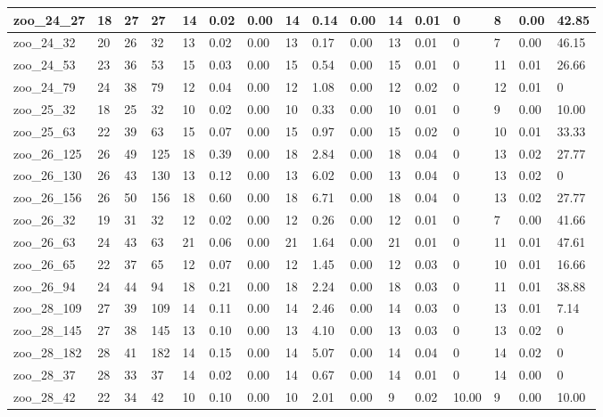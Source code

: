 \begin{landscape}
\begin{longtable}{llllllllllllllll}
zoo\_24\_27 & 18 & 27 & 27 & 14 & 0.02 & 0.00 & 14 & 0.14 & 0.00 & 14 & 0.01 & 0 & 8 & 0.00 & 42.85 \\ \hline 
zoo\_24\_32 & 20 & 26 & 32 & 13 & 0.02 & 0.00 & 13 & 0.17 & 0.00 & 13 & 0.01 & 0 & 7 & 0.00 & 46.15 \\ \hline 
zoo\_24\_53 & 23 & 36 & 53 & 15 & 0.03 & 0.00 & 15 & 0.54 & 0.00 & 15 & 0.01 & 0 & 11 & 0.01 & 26.66 \\ \hline 
zoo\_24\_79 & 24 & 38 & 79 & 12 & 0.04 & 0.00 & 12 & 1.08 & 0.00 & 12 & 0.02 & 0 & 12 & 0.01 & 0 \\ \hline 
zoo\_25\_32 & 18 & 25 & 32 & 10 & 0.02 & 0.00 & 10 & 0.33 & 0.00 & 10 & 0.01 & 0 & 9 & 0.00 & 10.00 \\ \hline 
zoo\_25\_63 & 22 & 39 & 63 & 15 & 0.07 & 0.00 & 15 & 0.97 & 0.00 & 15 & 0.02 & 0 & 10 & 0.01 & 33.33 \\ \hline 
zoo\_26\_125 & 26 & 49 & 125 & 18 & 0.39 & 0.00 & 18 & 2.84 & 0.00 & 18 & 0.04 & 0 & 13 & 0.02 & 27.77 \\ \hline 
zoo\_26\_130 & 26 & 43 & 130 & 13 & 0.12 & 0.00 & 13 & 6.02 & 0.00 & 13 & 0.04 & 0 & 13 & 0.02 & 0 \\ \hline 
zoo\_26\_156 & 26 & 50 & 156 & 18 & 0.60 & 0.00 & 18 & 6.71 & 0.00 & 18 & 0.04 & 0 & 13 & 0.02 & 27.77 \\ \hline 
zoo\_26\_32 & 19 & 31 & 32 & 12 & 0.02 & 0.00 & 12 & 0.26 & 0.00 & 12 & 0.01 & 0 & 7 & 0.00 & 41.66 \\ \hline 
zoo\_26\_63 & 24 & 43 & 63 & 21 & 0.06 & 0.00 & 21 & 1.64 & 0.00 & 21 & 0.01 & 0 & 11 & 0.01 & 47.61 \\ \hline 
zoo\_26\_65 & 22 & 37 & 65 & 12 & 0.07 & 0.00 & 12 & 1.45 & 0.00 & 12 & 0.03 & 0 & 10 & 0.01 & 16.66 \\ \hline 
zoo\_26\_94 & 24 & 44 & 94 & 18 & 0.21 & 0.00 & 18 & 2.24 & 0.00 & 18 & 0.03 & 0 & 11 & 0.01 & 38.88 \\ \hline 
zoo\_28\_109 & 27 & 39 & 109 & 14 & 0.11 & 0.00 & 14 & 2.46 & 0.00 & 14 & 0.03 & 0 & 13 & 0.01 & 7.14 \\ \hline 
zoo\_28\_145 & 27 & 38 & 145 & 13 & 0.10 & 0.00 & 13 & 4.10 & 0.00 & 13 & 0.03 & 0 & 13 & 0.02 & 0 \\ \hline 
zoo\_28\_182 & 28 & 41 & 182 & 14 & 0.15 & 0.00 & 14 & 5.07 & 0.00 & 14 & 0.04 & 0 & 14 & 0.02 & 0 \\ \hline 
zoo\_28\_37 & 28 & 33 & 37 & 14 & 0.02 & 0.00 & 14 & 0.67 & 0.00 & 14 & 0.01 & 0 & 14 & 0.00 & 0 \\ \hline 
zoo\_28\_42 & 22 & 34 & 42 & 10 & 0.10 & 0.00 & 10 & 2.01 & 0.00 & 9 & 0.02 & 10.00 & 9 & 0.00 & 10.00 \\ \hline 

\end{longtable}
\end{landscape}
